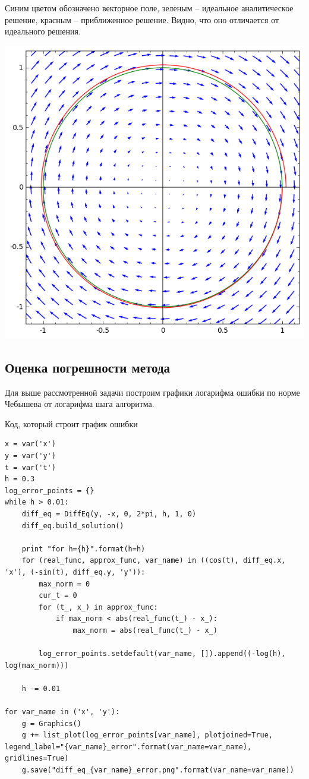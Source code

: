 \documentclass{article}
\theoremstyle{definition}
\theoremstyle{remark}
\begin{document}
Синим цветом обозначено векторное поле, зеленым -- идеальное аналитическое решение, красным -- приближенное решение. Видно, что оно отличается от идеального решения.

\includegraphics[width=1 \textwidth]{diff_eq_solution.png}

\subsection{Оценка погрешности метода}

Для выше рассмотренной задачи построим графики логарифма ошибки по норме Чебышева от логарифма шага алгоритма.

Код, который строит график ошибки
\begin{lstlisting}
x = var('x')
y = var('y')
t = var('t')
h = 0.3
log_error_points = {}
while h > 0.01:
	diff_eq = DiffEq(y, -x, 0, 2*pi, h, 1, 0)
	diff_eq.build_solution()

	print "for h={h}".format(h=h)
	for (real_func, approx_func, var_name) in ((cos(t), diff_eq.x, 'x'), (-sin(t), diff_eq.y, 'y')):
		max_norm = 0
		cur_t = 0
		for (t_, x_) in approx_func:
			if max_norm < abs(real_func(t_) - x_):
				max_norm = abs(real_func(t_) - x_)

		log_error_points.setdefault(var_name, []).append((-log(h), log(max_norm)))

	h -= 0.01

for var_name in ('x', 'y'):
	g = Graphics()
	g += list_plot(log_error_points[var_name], plotjoined=True, legend_label="{var_name}_error".format(var_name=var_name), gridlines=True)
	g.save("diff_eq_{var_name}_error.png".format(var_name=var_name))
\end{lstlisting}
\end{document}
